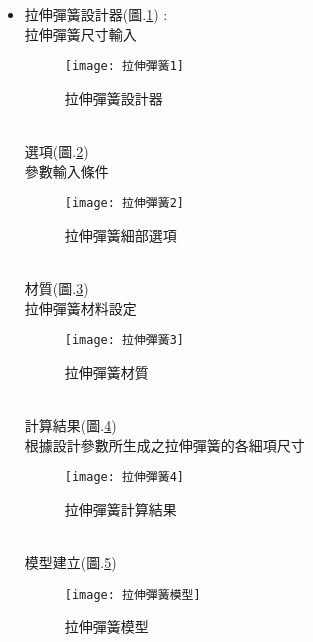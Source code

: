 \begin{itemize}
	\item 拉伸彈簧設計器(圖.\ref{2.56}) :\\
		拉伸彈簧尺寸輸入\\
		\begin{figure}[hbt!]
		\begin{center}
		\texttt{[image: 拉伸彈簧1]}
		\caption{\Large 拉伸彈簧設計器}\label{2.56}
		\end{center}
		\end{figure}
		\\
		選項(圖.\ref{2.57})\\
		參數輸入條件\\
		\begin{figure}[hbt!]
		\begin{center}
		\texttt{[image: 拉伸彈簧2]}
		\caption{\Large 拉伸彈簧細部選項}\label{2.57}
		\end{center}
		\end{figure}
		\\
		材質(圖.\ref{2.58})\\
		拉伸彈簧材料設定\\
		\begin{figure}[hbt!]
		\begin{center}
		\texttt{[image: 拉伸彈簧3]}
		\caption{\Large 拉伸彈簧材質}\label{2.58}
		\end{center}
		\end{figure}
		\\
		計算結果(圖.\ref{2.59})\\
		根據設計參數所生成之拉伸彈簧的各細項尺寸\\
		\begin{figure}[hbt!]
		\begin{center}
		\texttt{[image: 拉伸彈簧4]}
		\caption{\Large 拉伸彈簧計算結果}\label{2.59}
		\end{center}
		\end{figure}
		\\
		模型建立(圖.\ref{2.60})\\
		\begin{figure}[hbt!]
		\begin{center}
		\texttt{[image: 拉伸彈簧模型]}
		\caption{\Large 拉伸彈簧模型}\label{2.60}
		\end{center}
		\end{figure}
		\\
		
\newpage
		

\end{itemize}

